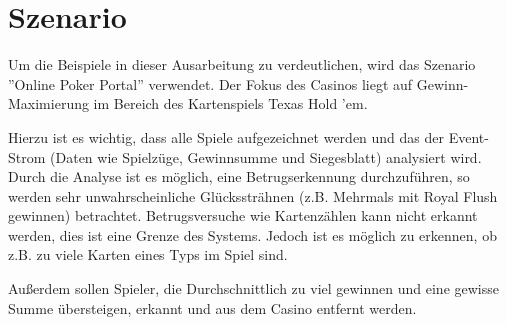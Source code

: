 \chapter{Szenario}
\label{Szenario}
Um die Beispiele in dieser Ausarbeitung zu verdeutlichen, wird das Szenario ''Online Poker Portal'' verwendet. Der Fokus des Casinos liegt auf Gewinn-Maximierung im Bereich des Kartenspiels Texas Hold 'em.

Hierzu ist es wichtig, dass alle Spiele aufgezeichnet werden und das der Event-Strom (Daten wie Spielzüge, Gewinnsumme und Siegesblatt) analysiert wird. 
Durch die Analyse ist es möglich, eine Betrugserkennung durchzuführen, so werden sehr unwahrscheinliche Glückssträhnen (z.B. Mehrmals mit Royal Flush gewinnen) betrachtet.
Betrugsversuche wie Kartenzählen kann nicht erkannt werden, dies ist eine Grenze des Systems. Jedoch ist es möglich zu erkennen, ob z.B. zu viele Karten eines Typs im Spiel sind.

Außerdem sollen Spieler, die Durchschnittlich zu viel gewinnen und eine gewisse Summe übersteigen, erkannt und aus dem Casino entfernt werden.
